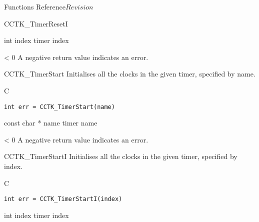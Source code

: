 \begin{cactuspart}{ Functions Reference}{}{$Revision$}
\begin{FunctionDescription}{CCTK\_TimerResetI}
\begin{ParameterSection}
\begin{Parameter} {int index}
timer index
\end{Parameter}
\end{ParameterSection}

\begin{ErrorSection}
\begin{Error}{< 0}
A negative return value indicates an error.
\end{Error}
\end{ErrorSection}
\end{FunctionDescription}


\begin{FunctionDescription}{CCTK\_TimerStart}
\label{CCTK-TimerStart}
Initialises all the clocks in the
given timer, specified by name.
\begin{SynopsisSection}
\begin{Synopsis}{C}
\begin{verbatim}
int err = CCTK_TimerStart(name)
\end{verbatim}
\end{Synopsis}
\end{SynopsisSection}

\begin{ParameterSection}
\begin{Parameter} {const char * name}
timer name
\end{Parameter}
\end{ParameterSection}

\begin{ErrorSection}
\begin{Error}{< 0}
A negative return value indicates an error.
\end{Error}
\end{ErrorSection}
\end{FunctionDescription}


\begin{FunctionDescription}{CCTK\_TimerStartI}
\label{CCTK-TimerStartI}
Initialises all the clocks in the
given timer, specified by index.
\begin{SynopsisSection}
\begin{Synopsis}{C}
\begin{verbatim}
int err = CCTK_TimerStartI(index)
\end{verbatim}
\end{Synopsis}
\end{SynopsisSection}

\begin{ParameterSection}
\begin{Parameter} {int index}
timer index
\end{Parameter}
\end{ParameterSection}


\end{FunctionDescription}
\end{cactuspart}
